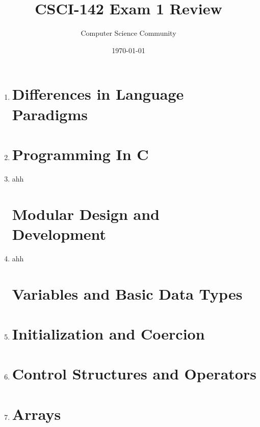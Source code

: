 \documentclass[11pt]{article}
\title{CSCI-142 Exam 1 Review}
\author{Computer Science Community}
\date{\today}
\begin{document}
\header

\begin{enumerate}

\section*{History and Evolution of Programming Languages}

	\item 

\section*{Differences in Language Paradigms}
	\item 

\section*{Programming In C}
	\item ahh

\section*{Modular Design and Development}
	\item ahh

\section*{Variables and Basic Data Types}

	\item 

\section*{Initialization and Coercion}

	\item 

\section*{Control Structures and Operators}
	\item 

\section*{Arrays}


\end{enumerate}
\end{document}
